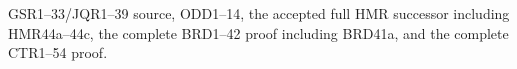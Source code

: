 GSR1--33/JQR1--39 source, ODD1--14, the accepted full
HMR successor including HMR44a--44c, the complete BRD1--42
proof including BRD41a, and the complete CTR1--54 proof.
